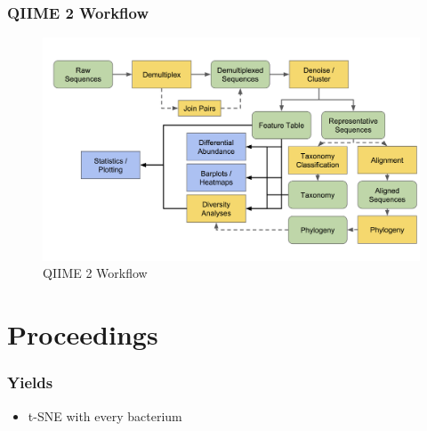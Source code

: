 \documentclass{beamer}
\begin{document}
    \begin{frame}
        \frametitle{QIIME 2 Workflow}

        \begin{figure}[h!]
            \includegraphics[width=0.8 \linewidth]{figures/workflow.png}
            \caption{QIIME 2 Workflow}
        \end{figure}
    \end{frame}

    \section{Proceedings}
    \begin{frame}[allowframebreaks]
        \frametitle{Yields}

        \begin{itemize}
            \item t-SNE with every bacterium
        \end{itemize}
    \end{frame}
\end{document}
